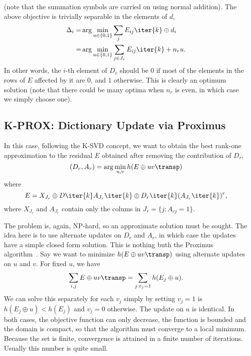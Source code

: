 \documentclass[a4paper]{IEEEtran}
\begin{document}
(note that the summation symbols are carried on using normal addition). The above objective is trivially separable in the elements of $d$,
 \begin{eqnarray}
 \Delta_i  =& \arg\min_{u \in \{0,1\}} \sum_j E_{ij}\iter{k} \oplus d_i\\
 =& \arg\min_{u \in \{0,1\}} \sum_{j\in J_r} E_{ij}\iter{k} + n_r u.
\label{eq:mob2}
 \end{eqnarray}
In other words, the $i$-th element of $D_r$ should be $0$ if most of the elements in the rows of $E$ affected by it are $0$, and $1$ otherwise. 
This is clearly an optimum solution (note that there could be many optima  when $n_r$ is even, in which case we simply choose one).

\subsection{K-PROX: Dictionary Update via Proximus}

In this case, following the K-SVD concept, we want to obtain the best rank-one approximation to the residual $E$ obtained after removing the contribution of $D_r$, 
\begin{equation}
(D_r,A_r) = \arg\min_{u,v} h(E \oplus uv\transp)
\label{eq:bsvd1}
\end{equation}
where
\begin{equation}
E =  X_{J_r} \oplus D\iter{k}A_{J_r}\iter{k} \oplus D_r\iter{k}(A_{J_r}\iter{k})^r,
\label{eq:bsvd2}
\end{equation}
where $X_{J_r}$ and $A_{J_r}$ contain only the colums in $J_r = \{j: A_{rj} = 1 \}$.

The problem   is, again, NP-hard, so an approximate solution must be sought. The idea here is to use alternate updates on $D_r$ and $A_r$, in which case the updates have a simple closed form solution. This is nothing buth the Proximus algorithm~\cite{proximus}. Say we want to minimize $h(E \oplus uv\transp)$ using alternate updates on $u$ and $v$. For fixed $u$, we have
$$
\sum_{i,j} E \oplus uv\transp = \sum_{j: v_j = 1} h(E_j \oplus u).
$$
We can solve this separately for each $v_j$ simply by setting $v_j = 1$ is $h(E_j \oplus u) < h(E_j)$ and $v_j=0$ otherwise. The update on $u$ is identical. In both cases, the objective function can only decrease, the function is bounded and the domain is compact, so that the algorithm must converge to a local minimum. Because the set is finite, convergence is attained in a finite number of iterations. Usually this number is quite small.
\end{document}
